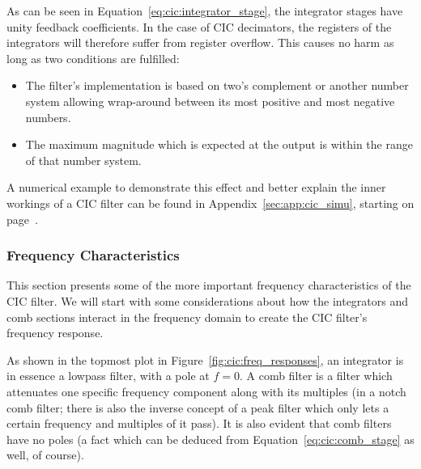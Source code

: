 As  can  be  seen in  Equation~\ref{eq:cic:integrator_stage},  the  integrator
stages have  unity feedback coefficients. In  the case of CIC  decimators, the
registers of  the integrators  will therefore  suffer from  register overflow.
This causes no harm as long as two conditions are fulfilled:
\begin{itemize}\tightlist
    \item
        The filter's  implementation is based  on two's complement  or another
        number system allowing wrap-around between  its most positive and most
        negative numbers.
    \item
        The maximum  magnitude which is expected  at the output is  within the
        range of that number system.
\end{itemize}

A numerical  example to demonstrate this  effect and better explain  the inner
workings  of a  CIC filter  can be  found in  Appendix~\ref{sec:app:cic_simu},
starting on page~\pageref{sec:app:cic_simu}.

%
%
\subsubsection{Frequency Characteristics} %
\label{subsubsec:cic:frequency_characteristics}

This section presents some of  the more important frequency characteristics of
the  CIC  filter. We  will  start  with  some  considerations  about  how  the
integrators and comb  sections interact in the frequency domain  to create the
CIC filter's frequency response.

As  shown  in  the  topmost plot  in  Figure~\ref{fig:cic:freq_responses},  an
integrator is  in essence a lowpass  filter, with a pole  at $f = 0$.   A comb
filter is  a filter  which attenuates one  specific frequency  component along
with its multiples (in a notch comb  filter; there is also the inverse concept
of a  peak filter  which only  lets a  certain frequency  and multiples  of it
pass).  It is also  evident that comb filters have no poles  (a fact which can
be deduced from Equation~\ref{eq:cic:comb_stage} as well, of course).

